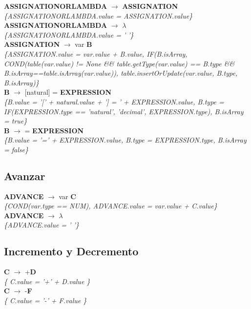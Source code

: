 \documentclass[10pt,a4paper]{article}
\begin{document}
\textbf{ASSIGNATIONORLAMBDA} $\rightarrow$ \textbf{ASSIGNATION} \\
\textit{\{ASSIGNATIONORLAMBDA.value = ASSIGNATION.value\}} \\

\textbf{ASSIGNATIONORLAMBDA} $\rightarrow$ $\lambda$ \\
\textit{\{ASSIGNATIONORLAMBDA.value = ' '\}} \\

\textbf{ASSIGNATION} $\rightarrow$ var \textbf{B} \\
\textit{\{ASSIGNATION.value = var.value + B.value, 
IF(B.isArray, COND(table(var.value) != None \&\& table.getType(var.value) == B.type \&\& B.isArray==table.isArray(var.value)), table.insertOrUpdate(var.value, B.type, B.isArray)\}} \\

\textbf{B} $\rightarrow$ [natural] = \textbf{EXPRESSION}  \\
\textit{\{B.value = '[' + natural.value + '] = ' + EXPRESSION.value, B.type = IF(EXPRESSION.type == 'natural', 'decimal', EXPRESSION.type), B.isArray = true\}} \\

\textbf{B} $\rightarrow$ = \textbf{EXPRESSION} \\
\textit{\{B.value = '=' + EXPRESSION.value, B.type = EXPRESSION.type, B.isArray = false\}} \\

\subsection{Avanzar}
\textbf{ADVANCE} $\rightarrow$ var \textbf{C} \\
\textit{\{COND(var.type == NUM), ADVANCE.value = var.value + C.value\}} \\

\textbf{ADVANCE} $\rightarrow$ $\lambda$ \\
\textit{\{ADVANCE.value = ' '\}} \\

\subsection{Incremento y Decremento}
\textbf{C} $\rightarrow$ +\textbf{D} \\ 
\textit{\{ C.value = '+' + D.value   \}} \\

\textbf{C} $\rightarrow$ -\textbf{F} \\
\textit{\{ C.value = '-' + F.value   \}} \\
\end{document}
